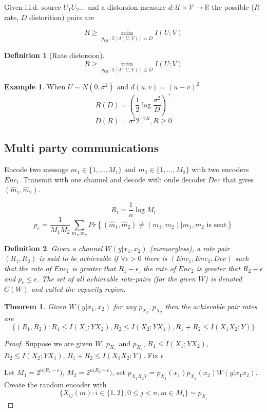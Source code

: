 \documentclass[twoside]{article}
\newtheorem{theorem}{Theorem}[section]
\newtheorem{definition}{Definition}[section]
\theoremstyle{definition} %
\newtheorem{example}{Example}
\renewcommand{\Pr}[1]{Pr\left\{#1\right\}}
\newcommand{\Ex}[1]{\mathbb{E}\left[#1\right]}
\def\V{\mathcal{V}}
\def\U{\mathcal{U}}
\def\R{\mathbb{R}}
\begin{document}

Given i.i.d. source $U_1U_2 \dots$ and a distorsion measure $d:\U \times \V \to \R$ the possible ($R$ rate, $D$ distorition) pairs are

\[
  R\geq \min_{p_{V|U} : \Ex{d(U,V)} = D} I(U;V)
\]

\begin{definition}[Rate distorsion]
  \[
    R\geq \min_{p_{V|U} : \Ex{d(U,V)} \leq D} I(U;V)
  \]
\end{definition}

\begin{example}
  When $U\sim N(0, \sigma^2)$ and $d(u,v) = (u-v)^2$
  \[
    R(D) = \left(\frac 1 2 \log \frac { \sigma^2} D \right)^+
  \]
  \[
    D(R) = \sigma^2 2^{-2R}, R \geq 0
  \]
\end{example}

\subsection{Multi party communications}

Encode two message $m_1 \in \{1, \dots, M_1\}$ and $m_2 \in \{1, \dots, M_2\}$ with two encoders $Enc_i$. Transmit with one channel and decode with onde decoder $Dec$ that gives $(\hat m_1, \hat m_2)$.

\[
  R_i = \frac 1 n \log M_i
\]
\[
  p_e = \frac 1 {M_1 M_2} \sum_{m_1, m_2} \Pr{(\hat m_1, \hat m_2) \not= (m_1, m_2) | m_1,m_2 \text{ is sent}}
\]

\begin{definition}
  Given a channel $W(y|x_1,x_2)$ (memoryless), a rate pair $(R_1, R_2)$ is said to be achievable if $\forall \epsilon > 0$ there is $(Enc_1, Enc_2, Dec)$ such that the rate of $Enc_1$ is greater that $R_1 - \epsilon$, the rate of $Enc_2$ is greater that $R_2 - \epsilon$ and $p_e \leq \epsilon$. The set of all achievable rate-pairs (for the given $W$) is denoted $C(W)$ and called the capacity region.
\end{definition}


\begin{theorem}
  Given $W(y|x_1,x_2)$ for any $p_{X_1}, p_{X_2}$ then the achievable pair rates are
  \[
    \{
      (R_1, R_2) : R_1 \leq I(X_1;YX_2), R_2 \leq I(X_2;YX_1), R_1+R_2 \leq I(X_1X_2;Y)
    \}
  \]
\end{theorem}

\begin{proof}
  Suppose we are given $W$, $p_{X_1}$ and $p_{X_2}$, $R_1 \leq I(X_1;YX_2)$, $R_2 \leq I(X_2;YX_1)$, $R_1 + R_2 \leq I(X_1X_2;Y)$. Fix $\epsilon$

  Let $M_1 = 2^{n(R_1 - \epsilon})$, $M_2 = 2^{n(R_2 - \epsilon})$, set $p_{X_1X_2Y} = p_{X_1}(x_1)p_{X_2}(x_2)W(y|x_1x_2)$. Create the random encoder with
  \[
    \{ X_{ij}(m) : i \in \{1,2\}, 0 \leq j < n, m \in M_i\} \sim p_{X_i}
  \]
\end{proof}
\end{document}
